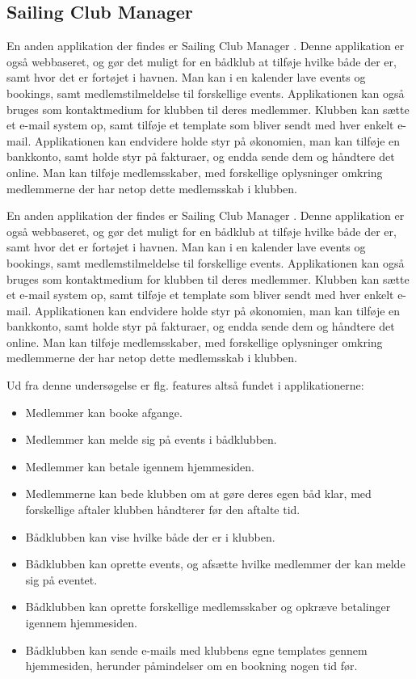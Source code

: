 \subsection*{Sailing Club Manager}
En anden applikation der findes er Sailing Club Manager \citep{SailClub}. 
Denne applikation er også webbaseret, og gør det muligt for en bådklub at tilføje hvilke både der er, samt hvor det er fortøjet i havnen.
Man kan i en kalender lave events og bookings, samt medlemstilmeldelse til forskellige events. 
Applikationen kan også bruges som kontaktmedium for klubben til deres medlemmer. 
Klubben kan sætte et e-mail system op, samt tilføje et template som bliver sendt med hver enkelt e-mail. 
Applikationen kan endvidere holde styr på økonomien, man kan tilføje en bankkonto, samt  holde styr på fakturaer, og endda sende dem og håndtere det online. 
Man kan tilføje medlemsskaber, med forskellige oplysninger omkring medlemmerne der har netop dette medlemsskab i klubben.

En anden applikation der findes er Sailing Club Manager \citep{SailClub}. Denne applikation er også
webbaseret, og gør det muligt for en bådklub at tilføje hvilke både der er, samt hvor det er fortøjet i
havnen. Man kan i en kalender lave events og bookings, samt medlemstilmeldelse til forskellige events. Applikationen kan også bruges som kontaktmedium for klubben til deres medlemmer. Klubben kan sætte et
e-mail system op, samt tilføje et template som bliver sendt med hver enkelt e-mail. Applikationen kan endvidere
holde styr på økonomien, man kan tilføje en bankkonto, samt  holde styr på fakturaer, og endda sende
dem og håndtere det online. Man kan tilføje medlemsskaber, med forskellige oplysninger omkring medlemmerne der
har netop dette medlemsskab i klubben.


Ud fra denne undersøgelse er flg. features altså fundet i applikationerne:

\begin{itemize}
	\item Medlemmer kan booke afgange.
	\item Medlemmer kan melde sig på events i bådklubben.
	\item Medlemmer kan betale igennem hjemmesiden.
	\item Medlemmerne kan bede klubben om at gøre deres egen båd klar, med forskellige aftaler klubben håndterer
        før den aftalte tid.
	\item Bådklubben kan vise hvilke både der er i klubben.
	\item Bådklubben kan oprette events, og afsætte hvilke medlemmer der kan melde sig på eventet.
	\item Bådklubben kan oprette forskellige medlemsskaber og opkræve betalinger igennem hjemmesiden.
	\item Bådklubben kan sende e-mails med klubbens egne templates gennem hjemmesiden, herunder påmindelser om en
        bookning nogen tid før.
\end{itemize}


